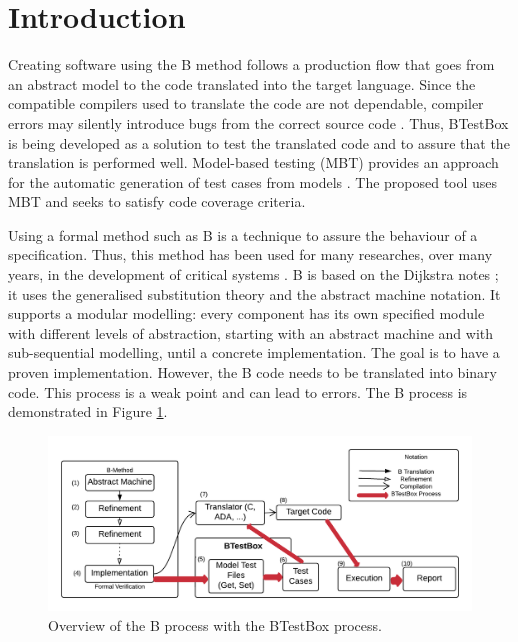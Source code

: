 \documentclass[runningheads]{llncs}
\begin{document}
\section{Introduction}

Creating software using the B method \cite{abrial2005b} follows a production flow that goes from an abstract model to the code translated into the target language. 
Since the compatible compilers used to translate the code are not dependable, compiler errors may silently introduce bugs from the correct source code \cite{leroy2009formal}.
Thus, BTestBox is being developed as a solution to test the translated code and to assure that the translation is performed well. 
Model-based testing (MBT) provides an approach for the automatic
generation of test cases from models \cite{dalal1999model}. The proposed tool uses MBT and seeks to satisfy code coverage criteria.

Using a formal method such as B is a technique to assure the behaviour of a specification.
Thus, this method has been used for many researches, over many years, in the development of critical systems \cite{valerio_thesis:2016}. B is based on the Dijkstra notes \cite{dijkstra1976discipline}; it uses the generalised substitution theory \cite{hoare2002proof} and the abstract machine notation. It supports a modular modelling:  every component has its own specified module with different levels of abstraction, starting with an abstract machine and with sub-sequential modelling, until a concrete implementation. The goal is to have a proven implementation. However, the B code needs to be translated into binary code. This process is a weak point and can lead to errors. The B process is demonstrated in Figure \ref{fig:Bmethod}.

\begin{figure}[ht]
    \centering
    \includegraphics[width = \textwidth]{imagens/BMethodBTestBoxColor.png}
    \caption{Overview of the B process with the BTestBox process.}
    \label{fig:Bmethod}
\end{figure}
\end{document}
